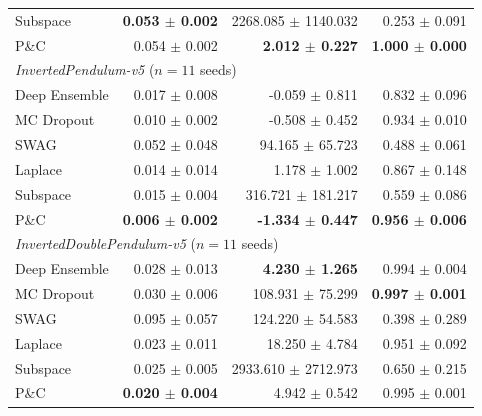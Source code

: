 \begin{table}[t]
\begin{tabular}{lrrr}
    Subspace & \textbf{0.053 $\pm$ 0.002} & 2268.085 $\pm$ 1140.032 & 0.253 $\pm$ 0.091 \\
    P\&C & 0.054 $\pm$ 0.002 & \textbf{2.012 $\pm$ 0.227} & \textbf{1.000 $\pm$ 0.000} \\
    \midrule
    \multicolumn{4}{l}{\textit{InvertedPendulum-v5} ($n=11$ seeds)} \\
    Deep Ensemble & 0.017 $\pm$ 0.008 & -0.059 $\pm$ 0.811 & 0.832 $\pm$ 0.096 \\
    MC Dropout & 0.010 $\pm$ 0.002 & -0.508 $\pm$ 0.452 & 0.934 $\pm$ 0.010 \\
    SWAG & 0.052 $\pm$ 0.048 & 94.165 $\pm$ 65.723 & 0.488 $\pm$ 0.061 \\
    Laplace & 0.014 $\pm$ 0.014 & 1.178 $\pm$ 1.002 & 0.867 $\pm$ 0.148 \\
    Subspace & 0.015 $\pm$ 0.004 & 316.721 $\pm$ 181.217 & 0.559 $\pm$ 0.086 \\
    P\&C & \textbf{0.006 $\pm$ 0.002} & \textbf{-1.334 $\pm$ 0.447} & \textbf{0.956 $\pm$ 0.006} \\
    \midrule
    \multicolumn{4}{l}{\textit{InvertedDoublePendulum-v5} ($n=11$ seeds)} \\
    Deep Ensemble & 0.028 $\pm$ 0.013 & \textbf{4.230 $\pm$ 1.265} & 0.994 $\pm$ 0.004 \\
    MC Dropout & 0.030 $\pm$ 0.006 & 108.931 $\pm$ 75.299 & \textbf{0.997 $\pm$ 0.001} \\
    SWAG & 0.095 $\pm$ 0.057 & 124.220 $\pm$ 54.583 & 0.398 $\pm$ 0.289 \\
    Laplace & 0.023 $\pm$ 0.011 & 18.250 $\pm$ 4.784 & 0.951 $\pm$ 0.092 \\
    Subspace & 0.025 $\pm$ 0.005 & 2933.610 $\pm$ 2712.973 & 0.650 $\pm$ 0.215 \\
    P\&C & \textbf{0.020 $\pm$ 0.004} & 4.942 $\pm$ 0.542 & 0.995 $\pm$ 0.001 \\
    \bottomrule
  \end{tabular}
\end{table}
